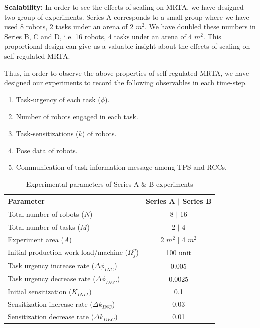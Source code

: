 \documentclass[smallcondensed]{svjour3}
\begin{document}
\textbf{Scalability:} In order to see the effects of scaling on MRTA, we have designed two group of experiments. Series A corresponds to a small group where we have used 8 robots, 2 tasks under an arena of 2 $m^2$. We have doubled these numbers in Series B, C and D, i.e. 16 robots, 4 tasks under an arena of 4 $m^2$. This proportional design can give us a valuable insight about the effects of scaling on self-regulated MRTA. 

Thus, in order to observe the above properties of self-regulated MRTA, we have designed our experiments to record the following  observables in each time-step.
\begin{enumerate}
\item Task-urgency of each task ($\phi$).
\item Number of robots engaged in each task.
\item Task-sensitizations ($k$) of robots.
\item Pose data of robots.
\item Communication of task-information message among TPS and RCCs.  
\end{enumerate}
\begin{table}
\caption{Experimental parameters of Series A \& B experiments}
\label{table:params}
\begin{center}
\begin{tabular}{|p{2in}|c|}
\hline Parameter & Series A $\mid$ Series B\\
\hline Total number of robots ($N$) & \hspace*{0.1cm} 8 $\mid$ 16\\
\hline Total number of tasks ($M$) & 2 $\mid$ 4\\
\hline Experiment area ($A$) & 2 $m^2$ $\mid$  4 $m^2$\\
\hline Initial production work load/machine ($\Omega_{j}^{p}$) & 100 unit \\
\hline Task urgency increase rate ($\Delta\phi_{INC}$) & 0.005\\
\hline Task urgency decrease rate ($\Delta\phi_{DEC}$) & 0.0025\\
\hline Initial sensitization ($K_{INIT}$) & 0.1\\
\hline Sensitization increase rate ($\Delta k_{INC}$) & 0.03\\
\hline Sensitization decrease rate ($\Delta k_{DEC}$) & 0.01\\
\hline
\end{tabular}
\end{center}
\end{table}
\end{document}
